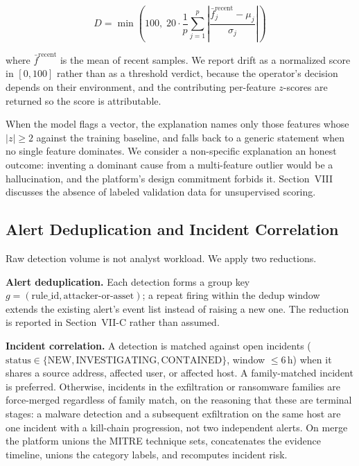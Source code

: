 \documentclass[conference]{IEEEtran}
\begin{document}
\begin{equation}
D = \min\!\left(100,\; 20 \cdot \frac{1}{p}\sum_{j=1}^{p}\left|\frac{\bar{f}^{\text{recent}}_j - \mu_j}{\sigma_j}\right|\right)
\end{equation}

\noindent where $\bar{f}^{\text{recent}}$ is the mean of recent samples. We
report drift as a normalized score in $[0,100]$ rather than as a threshold
verdict, because the operator's decision depends on their environment, and
the contributing per-feature $z$-scores are returned so the score is
attributable.

When the model flags a vector, the explanation names only those features
whose $|z| \geq 2$ against the training baseline, and falls back to a
generic statement when no single feature dominates. We consider a
non-specific explanation an honest outcome: inventing a dominant cause from
a multi-feature outlier would be a hallucination, and the platform's design
commitment forbids it. Section~VIII discusses the absence of labeled
validation data for unsupervised scoring.

\subsection{Alert Deduplication and Incident Correlation}

Raw detection volume is not analyst workload. We apply two reductions.

\textbf{Alert deduplication.} Each detection forms a group key
$g = (\text{rule\_id}, \text{attacker-or-asset})$; a repeat firing within
the dedup window extends the existing alert's event list instead of raising
a new one. The reduction is reported in Section~VII-C rather than assumed.

\textbf{Incident correlation.} A detection is matched against open incidents
($\text{status} \in \{\text{NEW}, \text{INVESTIGATING}, \text{CONTAINED}\}$,
window $\leq 6$\,h) when it shares a source address, affected user, or
affected host. A family-matched incident is preferred. Otherwise, incidents
in the exfiltration or ransomware families are force-merged regardless of
family match, on the reasoning that these are terminal stages: a malware
detection and a subsequent exfiltration on the same host are one incident
with a kill-chain progression, not two independent alerts. On merge the
platform unions the MITRE technique sets, concatenates the evidence timeline,
unions the category labels, and recomputes incident risk.
\end{document}
